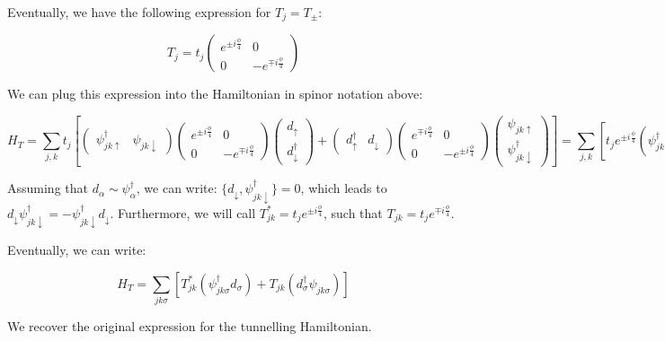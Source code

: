 Eventually, we have the following expression for \(T_j = T_\pm\):

\[ T_j = t_j \begin{pmatrix} e^{\pm i \frac{\phi}{4}} & 0 \\
0 & -e^{\mp i \frac{\phi}{4}}\end{pmatrix}\]

We can plug this expression into the Hamiltonian in spinor notation
above:

\[ H_T = \sum_{j,k} t_j \left[\begin{pmatrix}\psi_{jk\uparrow}^\dagger & \psi_{jk\downarrow}\end{pmatrix}\begin{pmatrix}e^{\pm i \frac{\phi}{4}} & 0 \\
0 & -e^{\mp i \frac{\phi}{4}}\end{pmatrix} \begin{pmatrix}d_\uparrow \\ d_{\downarrow}^\dagger \end{pmatrix} + \begin{pmatrix}d_\uparrow^\dagger & d_\downarrow \end{pmatrix}\begin{pmatrix}e^{\mp i \frac{\phi}{4}} & 0 \\
0 & -e^{\pm i \frac{\phi}{4}}\end{pmatrix}\begin{pmatrix}\psi_{jk\uparrow}\\ \psi_{jk\downarrow}^\dagger \end{pmatrix} \right] = \sum_{j,k} \left[t_j e^{\pm i\frac{\phi}{4}}\left(\psi_{jk\uparrow}^\dagger d_\uparrow - d_\downarrow \psi_{jk\downarrow}^\dagger \right) + t_j e^{\mp i \frac{\phi}{4}} \left(-\psi_{jk\downarrow}d_\downarrow^\dagger + d_\uparrow^\dagger \psi_{jk\uparrow}  \right)\right]\]

Assuming that \(d_\alpha \sim \psi_{\alpha}^\dagger\), we can write:
\(\{d_\downarrow,\psi_{jk\downarrow}^\dagger\} = 0\), which leads to
\(d_\downarrow \psi_{jk\downarrow}^\dagger = - \psi_{jk\downarrow}^\dagger d_\downarrow\).
Furthermore, we will call \(T_{jk}^* = t_j e^{\pm i \frac{\phi}{4}}\),
such that \(T_{jk} = t_j e^{\mp i \frac{\phi}{4}}\).

Eventually, we can write:

\[ H_T = \sum_{jk\sigma} \left[T_{jk}^* \left(\psi_{jk\sigma}^\dagger d_\sigma \right) + T_{jk} \left(d_\sigma^\dagger \psi_{jk\sigma} \right)\right]\]

We recover the original expression for the tunnelling Hamiltonian.

